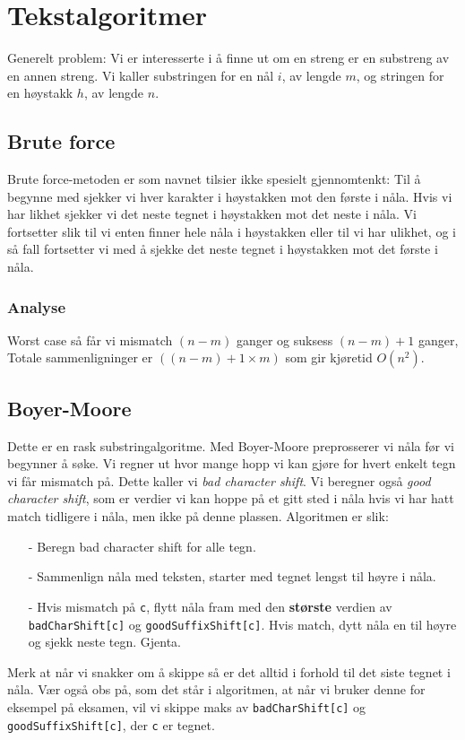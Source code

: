 \section{\color{red}Tekstalgoritmer}
	Generelt problem: Vi er interesserte i å finne ut om en streng er en substreng av en annen streng. Vi kaller substringen for en nål $i$, av lengde $m$, og stringen for en høystakk $h$, av lengde $n$.

	\subsection{Brute force}
		Brute force-metoden er som navnet tilsier ikke spesielt gjennomtenkt: Til å begynne med sjekker vi hver karakter i høystakken mot den første i nåla. Hvis vi har likhet sjekker vi det neste tegnet i høystakken mot det neste i nåla. Vi fortsetter slik til vi enten finner hele nåla i høystakken eller til vi har ulikhet, og i så fall fortsetter vi med å sjekke det neste tegnet i høystakken mot det første i nåla.

	\subsubsection{Analyse}
		Worst case så får vi mismatch $(n-m)$ ganger og suksess $(n-m)+1$ ganger, Totale sammenligninger er $((n-m)+1\times m)$ som gir kjøretid $O(n^2)$.

	\subsection{Boyer-Moore}
		Dette er en rask substringalgoritme. Med Boyer-Moore preprosserer vi nåla før vi begynner å søke. Vi regner ut hvor mange hopp vi kan gjøre for hvert enkelt tegn vi får mismatch på. Dette kaller vi \textit{bad character shift}. Vi beregner også \textit{good character shift}, som er verdier vi kan hoppe på et gitt sted i nåla hvis vi har hatt match tidligere i nåla, men ikke på denne plassen. \newline Algoritmen er slik:
		\begin{itemize}
			\item[-] Beregn bad character shift for alle tegn.
			\item[-] Sammenlign nåla med teksten, starter med tegnet lengst til høyre i nåla.
			\item[-] Hvis mismatch på \verb|c|, flytt nåla fram med den \textbf{største} verdien av \verb|badCharShift[c]| og \verb|goodSuffixShift[c]|. Hvis match, dytt nåla en til høyre og sjekk neste tegn. Gjenta.
		\end{itemize}
		Merk at når vi snakker om å skippe så er det alltid i forhold til det siste tegnet i nåla. Vær også obs på, som det står i algoritmen, at når vi bruker denne for eksempel på eksamen, vil vi skippe maks av \verb|badCharShift[c]| og \verb|goodSuffixShift[c]|, der \verb|c| er tegnet.

